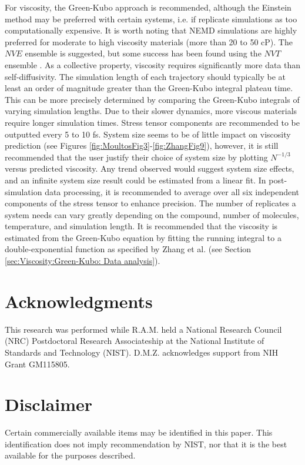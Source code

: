 \documentclass[9pt,bestpractices]{livecoms}
\begin{document}
For viscosity, the Green-Kubo approach is recommended, although the Einstein method may be preferred with certain systems, i.e. if replicate simulations as too computationally expensive. It is worth noting that NEMD simulations are highly preferred for moderate to high viscosity materials (more than 20 to 50 cP). The $NVE$ ensemble is suggested, but some success has been found using the $NVT$ ensemble \cite{Shirts2013,Fanourgakis2012}. As a collective property, viscosity requires significantly more data than self-diffusivity. The simulation length of each trajectory should typically be at least an order of magnitude greater than the Green-Kubo integral plateau time. This can be more precisely determined by comparing the Green-Kubo integrals of varying simulation lengths. Due to their slower dynamics, more viscous materials require longer simulation times. Stress tensor components are recommended to be outputted every 5 to 10 fs. System size seems to be of little impact on viscosity prediction (see Figures \ref{fig:MoultosFig3}-\ref{fig:ZhangFig9}), however, it is still recommended that the user justify their choice of system size by plotting $N^{-1/3}$ versus predicted viscosity. Any trend observed would suggest system size effects, and an infinite system size result could be estimated from a linear fit. In post-simulation data processing, it is recommended to average over all six independent components of the stress tensor to enhance precision. The number of replicates a system needs can vary greatly depending on the compound, number of molecules, temperature, and simulation length. It is recommended that the viscosity is estimated from the Green-Kubo equation by fitting the running integral to a double-exponential function as specified by Zhang et al. \cite{Zhang2015} (see Section \ref{sec:Viscosity:Green-Kubo: Data analysis}).

\section*{Acknowledgments}

This research was performed while R.A.M. held a National Research Council (NRC) Postdoctoral Research Associateship at the National Institute of Standards and Technology (NIST). D.M.Z. acknowledges support from NIH Grant GM115805.

\section*{Disclaimer}

Certain commercially available items may be identified in this paper. This identification does not imply recommendation by NIST, nor that it is the best available for the purposes described.



\end{document}
